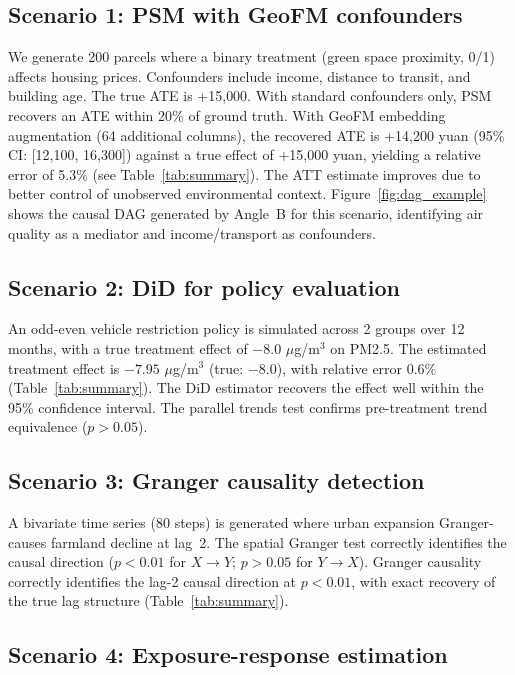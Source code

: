 \documentclass{article}
\begin{document}
\subsection{Scenario 1: PSM with GeoFM confounders}

We generate 200 parcels where a binary treatment (green space proximity, 0/1) affects housing prices. Confounders include income, distance to transit, and building age. The true ATE is +15{,}000. With standard confounders only, PSM recovers an ATE within 20\% of ground truth. With GeoFM embedding augmentation (64 additional columns), the recovered ATE is +14{,}200 yuan (95\% CI: [12{,}100, 16{,}300]) against a true effect of +15{,}000 yuan, yielding a relative error of 5.3\% (see Table~\ref{tab:summary}). The ATT estimate improves due to better control of unobserved environmental context. Figure~\ref{fig:dag_example} shows the causal DAG generated by Angle~B for this scenario, identifying air quality as a mediator and income/transport as confounders.

\subsection{Scenario 2: DiD for policy evaluation}

An odd-even vehicle restriction policy is simulated across 2 groups over 12 months, with a true treatment effect of $-8.0$ $\mu$g/m$^3$ on PM2.5. The estimated treatment effect is $-7.95$ $\mu$g/m$^3$ (true: $-8.0$), with relative error 0.6\% (Table~\ref{tab:summary}). The DiD estimator recovers the effect well within the 95\% confidence interval. The parallel trends test confirms pre-treatment trend equivalence ($p > 0.05$).

\subsection{Scenario 3: Granger causality detection}

A bivariate time series (80 steps) is generated where urban expansion Granger-causes farmland decline at lag~2. The spatial Granger test correctly identifies the causal direction ($p < 0.01$ for $X \to Y$; $p > 0.05$ for $Y \to X$). Granger causality correctly identifies the lag-2 causal direction at $p < 0.01$, with exact recovery of the true lag structure (Table~\ref{tab:summary}).

\subsection{Scenario 4: Exposure-response estimation}
\end{document}
